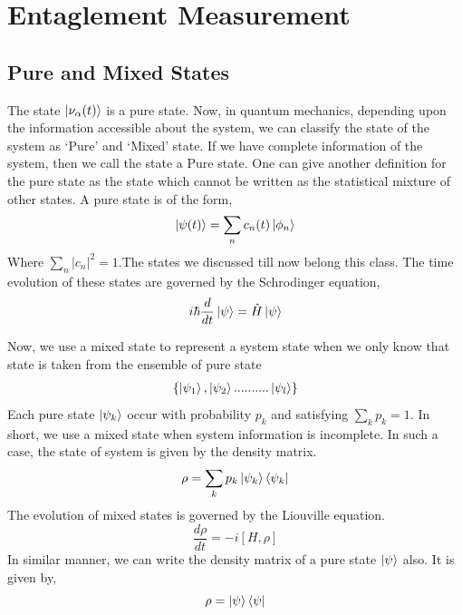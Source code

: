 \documentclass[12pt,a4paper]{report}
\begin{document}
\section{Entaglement Measurement}
\subsection{Pure and Mixed States}
The state $\ket{\nu_{\alpha}(t)}$ is a pure state. Now, in quantum mechanics, depending upon the information accessible about the system, we can classify the state of the system as ‘Pure’ and ‘Mixed’ state. If we have complete information of the system, then we call the state a Pure state. One can give another definition for the pure state as the state which cannot be written as the statistical mixture of other states. A pure state is of the form,
\begin{equation}
\ket{\psi(t)}=\sum_{n}c_{n}(t)\ket{\phi_{n}}
\end{equation}
Where $\sum_{n}|c_{n}|^{2}=1$.The states we discussed till now belong this class. The time evolution of these states are governed by the Schrodinger equation,
\begin{equation}
    i\hbar\frac{d}{dt}\ket{\psi} = \hat{H}\ket{\psi}
\end{equation}\par
Now, we use a mixed state to represent a system state when we only know that state is taken from the ensemble of pure state
\begin{gather}
\{\ket{\psi_{1}},\ket{\psi_{2}}..........\ket{\psi_{l}}\}
\end{gather}
Each pure state $\ket{\psi_{k}}$ occur with probability $p_{k}$ and  satisfying $\sum_{k}p_{k}=1$. In short, we use a mixed state when system information is incomplete. In such a case, the state of system is given by the density matrix.
\begin{equation}
\rho = \sum_{k}p_{k}\ket{\psi_{k}}\bra{\psi_{k}}
\end{equation}
The evolution of mixed states is governed by the Liouville equation.
\begin{equation}
\frac{d\rho}{dt} = -i\left[H,\rho\right]
\end{equation}
In similar manner, we can write the density matrix of a pure state $\ket{\psi}$ also. It is given by,
\begin{equation}
\rho = \ket{\psi}\bra{\psi}
\end{equation}
\end{document}
